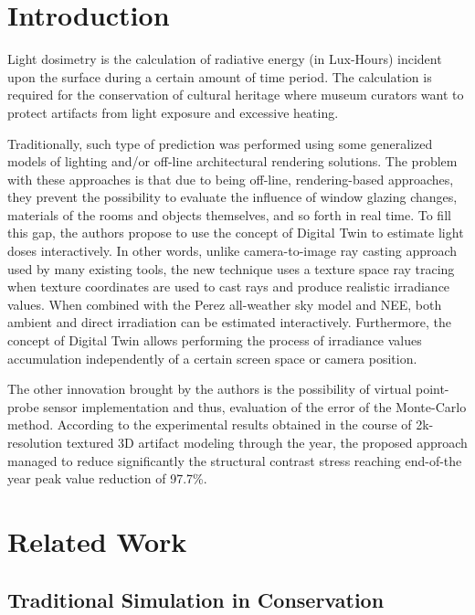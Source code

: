 \documentclass[conference]{IEEEtran}
\begin{document}
\section{Introduction}

Light dosimetry is the calculation of radiative energy (in Lux-Hours) incident upon the surface during a certain amount of time period. The calculation is required for the conservation of cultural heritage where museum curators want to protect artifacts from light exposure and excessive heating.

Traditionally, such type of prediction was performed using some generalized models of lighting and/or off-line architectural rendering solutions. The problem with these approaches is that due to being off-line, rendering-based approaches, they prevent the possibility to evaluate the influence of window glazing changes, materials of the rooms and objects themselves, and so forth in real time. To fill this gap, the authors propose to use the concept of Digital Twin to estimate light doses interactively. In other words, unlike camera-to-image ray casting approach used by many existing tools, the new technique uses a texture space ray tracing when texture coordinates are used to cast rays and produce realistic irradiance values. When combined with the Perez all-weather sky model and NEE, both ambient and direct irradiation can be estimated interactively. Furthermore, the concept of Digital Twin allows performing the process of irradiance values accumulation independently of a certain screen space or camera position.

The other innovation brought by the authors is the possibility of virtual point-probe sensor implementation and thus, evaluation of the error of the Monte-Carlo method. According to the experimental results obtained in the course of 2k-resolution textured 3D artifact modeling through the year, the proposed approach managed to reduce significantly the structural contrast stress reaching end-of-the year peak value reduction of 97.7\%.

\section{Related Work}

\subsection{Traditional Simulation in Conservation}
\end{document}

